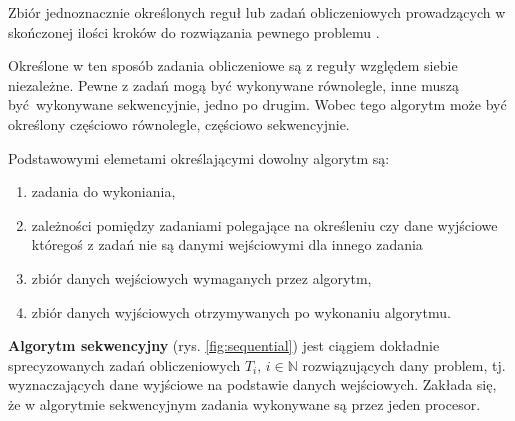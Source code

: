 \begin{definicja}[Algorytm]\label{def:algorytm}
Zbiór jednoznacznie określonych reguł lub zadań obliczeniowych prowadzących w skończonej ilości kroków do rozwiązania pewnego problemu \cite{IEEE}.
\end{definicja}


Określone w ten sposób zadania obliczeniowe są z reguły względem siebie niezależne. Pewne z zadań mogą być wykonywane równolegle, inne muszą być wykonywane sekwencyjnie, jedno po drugim. Wobec tego algorytm może być określony częściowo równolegle, częściowo sekwencyjnie.


Podstawowymi elemetami określającymi dowolny algorytm są:
\begin{enumerate}
\item zadania do wykoniania,
\item zależności pomiędzy zadaniami polegające na określeniu czy 
dane wyjściowe któregoś z zadań nie są danymi wejściowymi dla innego zadania
\item zbiór danych wejściowych wymaganych przez algorytm,
\item zbiór danych wyjściowych otrzymywanych po wykonaniu algorytmu.
\end{enumerate}


\begin{definicja}\label{def:algorytm_sekwencyjny}
\textbf{Algorytm sekwencyjny} (rys.  \ref{fig:sequential}) jest ciągiem dokładnie sprecyzowanych zadań obliczeniowych \(T_i,\, i\in\mathbb{N}\) rozwiązujących dany problem, tj. wyznaczających dane wyjściowe na podstawie danych wejściowych. Zakłada się, że w algorytmie sekwencyjnym zadania wykonywane są przez jeden procesor.

\end{definicja}

